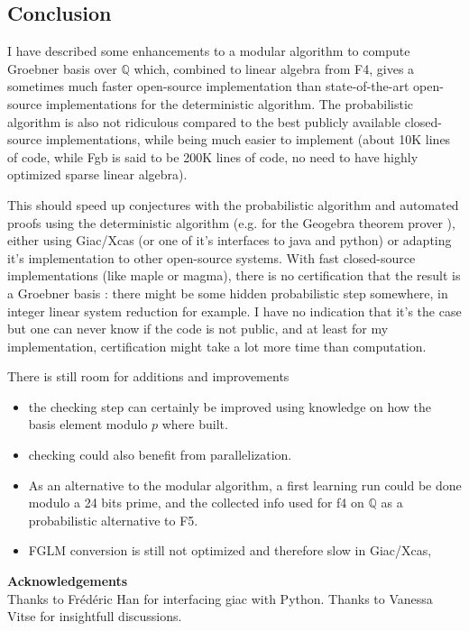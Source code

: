 \documentclass[a4paper,11pt]{article}
\newcommand{\Q}{{\mathbb{Q}}}
\begin{document}
\begin{giacjshere}
\subsection{Conclusion}
I have described some enhancements to a modular algorithm
to compute Groebner basis over $\Q$ which, combined to 
linear algebra from F4, gives
a sometimes much faster open-source implementation 
than state-of-the-art open-source implementations 
for the deterministic algorithm. 
The probabilistic algorithm is also not ridiculous
compared to the best publicly available closed-source implementations,
while being much easier to implement
(about 10K lines of code, while Fgb is said to be 200K lines of code,
no need to have highly optimized sparse linear algebra).

This should speed up conjectures with the probabilistic algorithm
and automated proofs using the deterministic
algorithm (e.g. for the Geogebra theorem prover
\cite{botanaimplementing}), 
either using Giac/Xcas (or one of it's interfaces
to java and python) or adapting it's implementation
to other open-source systems.
With fast closed-source implementations (like maple or magma), 
there is no certification that the result is a Groebner basis :
there might be some hidden probabilistic
step somewhere, in integer linear system reduction for example. I have
no indication that it's the case but one can never know if the code is
not public, and at least for my implementation, certification
might take a lot more time than computation. 

There is still room for additions and improvements
\begin{itemize}
\item the checking step can certainly be improved using
knowledge on how the basis element modulo $p$ where
built.
\item checking could also benefit from parallelization.
\item As an alternative to the modular algorithm,
a first learning run could be done modulo a 24 bits prime, and
the collected info used for f4 on $\Q$ as a probabilistic alternative
to F5.
\item FGLM conversion is still not optimized and therefore
slow in Giac/Xcas, 
\end{itemize}


{\bf Acknowledgements} \\
Thanks to Fr\'ed\'eric Han for interfacing giac with Python.
Thanks to Vanessa Vitse for insightfull discussions.


\end{giacjshere}
\end{document}
